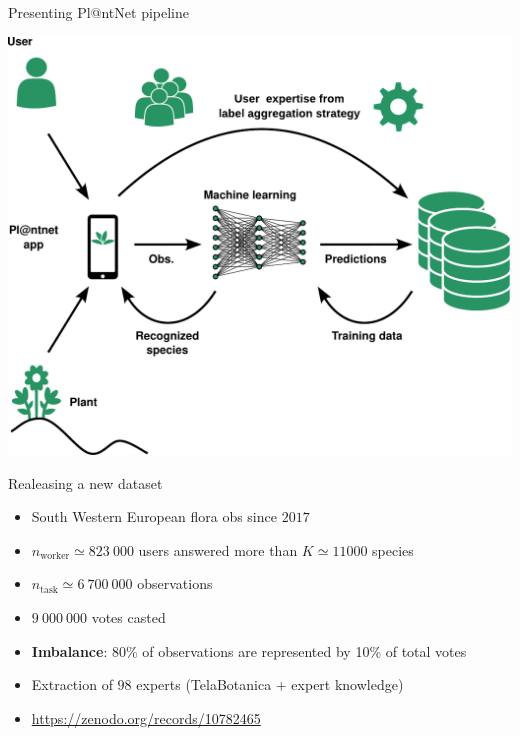 \begin{frame}{Presenting Pl@ntNet pipeline}
\begin{center}
    \includegraphics[width=.85\textwidth]{../chapters/images/plantnet_schema_global_green.pdf}
\end{center}
\end{frame}
\begin{frame}{Realeasing a new dataset}{}
    \begin{itemize}
        \item South Western European flora obs since $2017$
        \item $n_{\text{worker}}\simeq 823\ 000$ users answered more than $K\simeq 11 000$ species
        \item $n_{\text{task}}\simeq 6\ 700\ 000$ observations
        \item $9\ 000\ 000$ votes casted
        \item \textbf{Imbalance}: 80\% of observations are represented by 10\% of total votes
    \end{itemize}
\pause
\vspace{1cm}
\begin{itemize}
    \item Extraction of $98$ experts (TelaBotanica + expert knowledge)
    \vspace{1cm}
    \item \url{https://zenodo.org/records/10782465}
\end{itemize}
\end{frame}

